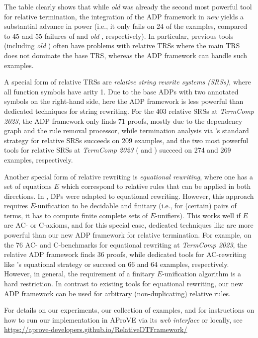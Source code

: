 The table clearly shows that while \emph{old} \aprove{} was already the second most powerful
tool for relative termination, the integration of the ADP framework in \emph{new} \aprove{}
yields a substantial advance in power (i.e., it only fails on 24 of the examples, compared
to 45 and 55 failures of \natt{} and \emph{old} \aprove, respectively).
In particular,  previous tools (including 
\emph{old} \aprove{}) often have problems with
relative TRSs where the main TRS does
 not dominate the base TRS, whereas the ADP framework can handle
 such examples.


A special form of relative TRSs are \emph{relative string rewrite systems (SRSs)}, where all function
symbols have arity 1.
Due to the base ADPs with two annotated
symbols on the right-hand side, 
here the ADP framework is less powerful
than dedicated techniques for string rewriting.
For the 403 relative SRSs at \emph{TermComp 2023},
the ADP framework only finds 71 proofs, mostly due to the dependency graph and the rule removal processor, 
while termination analysis via \aprove's
standard strategy for relative SRSs
succeeds on 209 examples, and the two most powerful tools for relative SRSs at
\emph{TermComp 2023} (\mnm{} and \matchbox{} \cite{matchbox})
succeed on 274 and 269 examples, respectively.


Another special form of relative rewriting is \emph{equational rewriting}, where one has
a set of equations $E$ which correspond to relative rules that can be applied in both directions.
In \cite{RTA01}, DPs were adapted to equational rewriting.
However, this approach requires
$E$-unification to be decidable and finitary
(i.e., for (certain) pairs of terms, 
it has to compute  finite complete sets of $E$-unifiers).
This works well if $E$
are AC- or C-axioms, and for this special case, dedicated techniques like
\cite{RTA01} are more powerful than our new ADP framework for relative termination.
For example, on the 76 AC- and C-benchmarks  for equational rewriting at \emph{TermComp 2023},
the  relative ADP framework  finds 36 proofs, while dedicated
tools for AC-rewriting like \aprove's equational strategy or \muterm{} \cite{gutierrez_mu-term_2020} succeed on
66 and 64 examples, respectively.
However, in general, the requirement of a finitary
$E$-unification algorithm is a  hard restriction.
In contrast to existing tools for equational rewriting,
our new ADP framework can be used for arbitrary
(non-duplicating) relative rules.

For details on our experiments, our collection of examples,
and for instructions on how to run our implementation
in \textsf{AProVE} via its \emph{web interface} or locally, see
\url{https://aprove-developers.github.io/RelativeDTFramework/}
